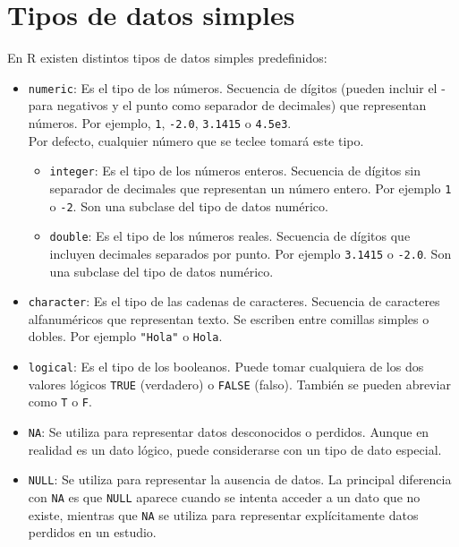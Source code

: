 \documentclass[
  a4paper,
]{scrreport}
\theoremstyle{definition}
\theoremstyle{definition}
\theoremstyle{remark}
\begin{document}

\hypertarget{tipos-de-datos-simples}{%
\chapter{Tipos de datos simples}\label{tipos-de-datos-simples}}

En R existen distintos tipos de datos simples predefinidos:

\begin{itemize}
\item
  \texttt{numeric}: Es el tipo de los números. Secuencia de dígitos
  (pueden incluir el - para negativos y el punto como separador de
  decimales) que representan números. Por ejemplo, \texttt{1},
  \texttt{-2.0}, \texttt{3.1415} o \texttt{4.5e3}.\\
  Por defecto, cualquier número que se teclee tomará este tipo.

  \begin{itemize}
  \item
    \texttt{integer}: Es el tipo de los números enteros. Secuencia de
    dígitos sin separador de decimales que representan un número entero.
    Por ejemplo \texttt{1} o \texttt{-2}. Son una subclase del tipo de
    datos numérico.
  \item
    \texttt{double}: Es el tipo de los números reales. Secuencia de
    dígitos que incluyen decimales separados por punto. Por ejemplo
    \texttt{3.1415} o \texttt{-2.0}. Son una subclase del tipo de datos
    numérico.
  \end{itemize}
\item
  \texttt{character}: Es el tipo de las cadenas de caracteres. Secuencia
  de caracteres alfanuméricos que representan texto. Se escriben entre
  comillas simples o dobles. Por ejemplo \texttt{"Hola"} o
  \texttt{\textquotesingle{}Hola\textquotesingle{}}.
\item
  \texttt{logical}: Es el tipo de los booleanos. Puede tomar cualquiera
  de los dos valores lógicos \texttt{TRUE} (verdadero) o \texttt{FALSE}
  (falso). También se pueden abreviar como \texttt{T} o \texttt{F}.
\item
  \texttt{NA}: Se utiliza para representar datos desconocidos o
  perdidos. Aunque en realidad es un dato lógico, puede considerarse con
  un tipo de dato especial.
\item
  \texttt{NULL}: Se utiliza para representar la ausencia de datos. La
  principal diferencia con \texttt{NA} es que \texttt{NULL} aparece
  cuando se intenta acceder a un dato que no existe, mientras que
  \texttt{NA} se utiliza para representar explícitamente datos perdidos
  en un estudio.
\end{itemize}
\end{document}
